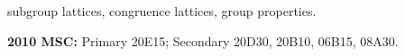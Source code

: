 \documentclass[11pt]{amsart}
\theoremstyle{plain}
\theoremstyle{definition}
\theoremstyle{remark}
\numberwithin{theorem}{section}
\numberwithin{claim}{section}
\numberwithin{equation}{section}
\numberwithin{conjecture}{section}
\newcommand{\<}{\ensuremath{\langle}}
\renewcommand{\>}{\ensuremath{\rangle}}
\newcommand{\0}{\ensuremath{\mathbf{0}}}
\newcommand{\1}{\ensuremath{\mathbf{1}}}
\newcommand{\2}{\ensuremath{\mathbf{2}}}
\newcommand{\3}{\ensuremath{\mathbf{3}}}
\newcommand{\4}{\ensuremath{\mathbf{4}}}
\newcommand{\5}{\ensuremath{\mathbf{5}}}
\newcommand{\IE}{{\small IE}}
\begin{document}
\begin{abstract}
\end{abstract}

 subgroup lattices, congruence lattices, group properties.

\medskip

\noindent \textbf{2010 MSC:} Primary 
20E15; %
Secondary 20D30, %
20B10, %
06B15, %
08A30.      %
\bigskip


\newcommand{\defn}[1]{\emph{#1}}
\end{document}
